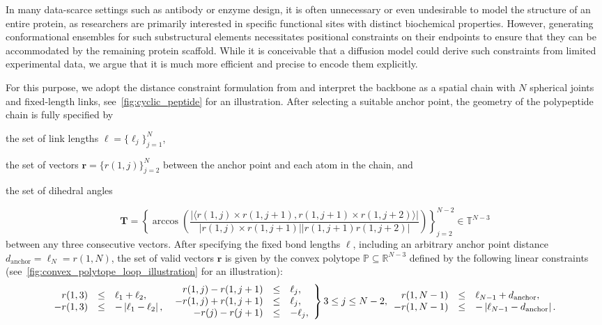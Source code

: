 In many data-scarce settings such as antibody or enzyme design, it is often unnecessary or even undesirable to model the structure of an entire protein, as researchers are primarily interested in specific functional sites with distinct biochemical properties.
However, generating conformational ensembles for such substructural elements necessitates positional constraints on their endpoints to ensure that they can be accommodated by the remaining protein scaffold.
While it is conceivable that a diffusion model could derive such constraints from limited experimental data, we argue that it is much more efficient and precise to encode them explicitly.

For this purpose, we adopt the distance constraint formulation from \textcite{han2006inverse} and interpret the backbone as a spatial chain with \(N\) spherical joints and fixed-length links, see~\cref{fig:cyclic_peptide} for an illustration.
After selecting a suitable anchor point, the geometry of the polypeptide chain is fully specified by \begin{enumerate*}[label=(\alph*)] \item the set of link lengths \(\mathbf{\ell}=\{\ell_j\}_{j=1}^{N}\), \item the set of vectors \(\mathbf{r}=\{r(1,j)\}_{j=2}^{N}\) between the anchor point and each atom in the chain, and \item the set of dihedral angles\end{enumerate*} \[ \mathbf{T}=\left\{\arccos\left(\frac{\vert\langle r(1,j)\times r(1,j+1), r(1,j+1)\times r(1,j+2)\rangle\vert}{\vert r(1,j)\times r(1,j+1)\vert\vert r(1,j+1) r(1,j+2)\vert}\right)\right\}_{j=2}^{N-2}\in\mathbb{T}^{N-3} \] between any three consecutive vectors.
After specifying the fixed bond lengths \(\ell\), including an arbitrary anchor point distance \(d_\text{anchor}=\ell_N=r(1,N)\), the set of valid vectors \(\mathbf{r}\) is given by the convex polytope \(\mathbb{P}\subseteq\mathbb{R}^{N-3}\) defined by the following linear constraints (see~\cref{fig:convex_polytope_loop_illustration} for an illustration): 
\[ 
	\begin{array}{rcl} r(1,3) & \leq & \ell_1+\ell_2 , \\ -r(1,3) & \leq & -\left|\ell_1-\ell_2\right|, \\ 
	\end{array} 
	\\
	\left.
	\begin{array}{rcl}
		r(1, j)-r(1, j+1)  & \leq & \ell_j,  \\
		-r(1, j)+r(1, j+1) & \leq & \ell_j,  \\
		-r(j)-r(j+1)       & \leq & -\ell_j,
	\end{array}\right\}3 \leq j \leq N-2,
	\\
	\begin{array}{rcl}
		r(1, N-1)  & \leq & \ell_{N-1}+d_\text{anchor},               \\
		-r(1, N-1) & \leq & -\left|\ell_{N-1}-d_\text{anchor}\right|.
	\end{array}
\]
